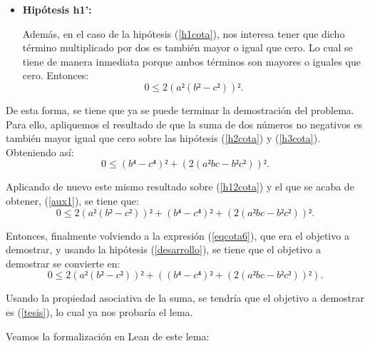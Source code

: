 \begin{demostracion}
\begin{itemize}
  \item\textbf{Hipótesis h1':}

    Además, en el caso de la hipótesis (\ref{h1cota}), nos interesa
    tener que dicho término multiplicado por dos es también mayor o igual
    que cero. Lo cual se tiene de manera inmediata porque ambos términos
    son mayores o iguales que cero. Entonces:
    \begin{equation}
      0 ≤ 2(a²(b²-c²))².\label{h12cota}\tag{h1'}
    \end{equation}
  \end{itemize}

  De esta forma, se tiene que ya se puede terminar la demostración del
  problema. Para ello, apliquemos el resultado de que la suma de dos
  números no negativos es también mayor igual que cero sobre las hipótesis
  (\ref{h2cota}) y (\ref{h3cota}). Obteniendo así:
  \begin{equation}\label{aux1}\tag{aux1}
    0 ≤ (b⁴-c⁴)²+(2(a²bc-b²c²))².
  \end{equation}

  Aplicando de nuevo este mismo resultado sobre (\ref{h12cota}) y el que
  se acaba de obtener, (\ref{aux1}), se tiene que:
  \begin{equation}\label{tesis}\tag{tesis}
    0 ≤ 2(a²(b²-c²))²+(b⁴-c⁴)²+(2(a²bc-b²c²))².
  \end{equation}

  Entonces, finalmente volviendo a la expresión (\ref{eqcota6}), que era
  el objetivo a demostrar, y usando la hipótesis (\ref{desarrollo}), se
  tiene que el objetivo a demostrar se convierte en:
  \begin{equation}
    0 ≤ 2(a²(b²-c²))²+((b⁴-c⁴)²+(2(a²bc-b²c²))²).
  \end{equation}

  Usando la propiedad asociativa de la suma, se tendría que el objetivo a
  demostrar es (\ref{tesis}), lo cual ya nos probaría el lema.
\end{demostracion}

Veamos la formalización en Lean de este lema:

